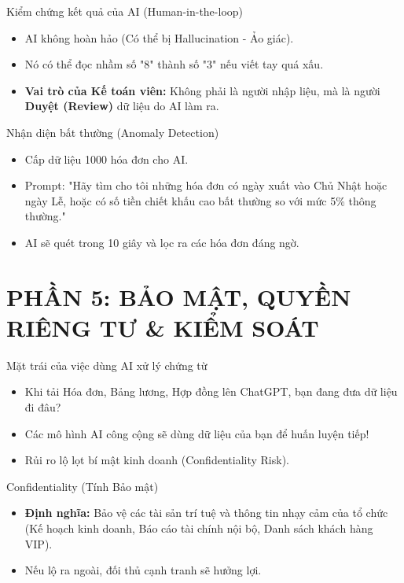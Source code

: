 \documentclass[aspectratio=169]{beamer}
\begin{document}
\begin{frame}{Kiểm chứng kết quả của AI (Human-in-the-loop)}
    \begin{itemize}
        \item AI không hoàn hảo (Có thể bị Hallucination - Ảo giác).
        \item Nó có thể đọc nhầm số "8" thành số "3" nếu viết tay quá xấu.
        \item \textbf{Vai trò của Kế toán viên:} Không phải là người nhập liệu, mà là người \textbf{Duyệt (Review)} dữ liệu do AI làm ra.
    \end{itemize}
\end{frame}


\begin{frame}{Nhận diện bất thường (Anomaly Detection)}
    \begin{itemize}
        \item Cấp dữ liệu 1000 hóa đơn cho AI.
        \item Prompt: "Hãy tìm cho tôi những hóa đơn có ngày xuất vào Chủ Nhật hoặc ngày Lễ, hoặc có số tiền chiết khấu cao bất thường so với mức 5\% thông thường."
        \item AI sẽ quét trong 10 giây và lọc ra các hóa đơn đáng ngờ.
    \end{itemize}
\end{frame}


\section{PHẦN 5: BẢO MẬT, QUYỀN RIÊNG TƯ \& KIỂM SOÁT}


\begin{frame}{Mặt trái của việc dùng AI xử lý chứng từ}
    \begin{itemize}
        \item Khi tải Hóa đơn, Bảng lương, Hợp đồng lên ChatGPT, bạn đang đưa dữ liệu đi đâu?
        \item Các mô hình AI công cộng sẽ dùng dữ liệu của bạn để huấn luyện tiếp!
        \item Rủi ro lộ lọt bí mật kinh doanh (Confidentiality Risk).
    \end{itemize}
\end{frame}


\begin{frame}{Confidentiality (Tính Bảo mật)}
    \begin{itemize}
        \item \textbf{Định nghĩa:} Bảo vệ các tài sản trí tuệ và thông tin nhạy cảm của tổ chức (Kế hoạch kinh doanh, Báo cáo tài chính nội bộ, Danh sách khách hàng VIP).
        \item Nếu lộ ra ngoài, đối thủ cạnh tranh sẽ hưởng lợi.
    \end{itemize}
\end{frame}
\end{document}
